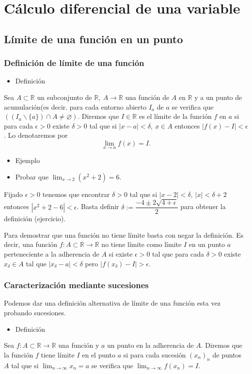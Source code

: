 \section{Cálculo diferencial de una variable}
\subsection{Límite de una función en un punto}
\subsubsection{Definición de límite de una función}
\begin{itemize}[label=\color{red}\textbullet, leftmargin=*]
	\item \color{lightblue}Definición
\end{itemize}
Sea $A\subset\mathbb{R}$ un subconjunto de $\mathbb{R},~A\rightarrow\mathbb{R}$ una función de $A$ en $\mathbb{R}$ y a un punto de acumulación(es decir. para cada entorno abierto $I_a$ de $a$ se verifica que $\left((I_a\backslash\{a\})\cap A\neq\varnothing\right)$. Diremos que $I\in\mathbb{R}$ es el límite de la función $f$ en $a$ si para cada $\epsilon>0$ existe $\delta>0$ tal que si $|x-a|<\delta,~x\in A$ entonces $|f(x)-I|<\epsilon$. Lo denotaremos por \[ \lim_{x\to a}f(x)=I. \]
\begin{itemize}[label=\color{red}\textbullet, leftmargin=*]
	\item \color{lightblue}Ejemplo
\end{itemize}
\begin{itemize}
	\item Probar que $\lim_{x\to2}(x^2+2)=6$.
\end{itemize}
Fijado $\epsilon>0$ tenemos que encontrar $\delta>0$ tal que si $|x-2|<\delta,~|x|<\delta+2$ entonces $|x^2+2-6|<\epsilon$. Basta definir $\delta:=\dfrac{-4\pm2\sqrt{4+\epsilon}}{2}$ para obtener la definición (ejercicio).

Para demostrar que una función no tiene límite basta con negar la definición. Es decir, una función $f:A\subset\mathbb{R}\longrightarrow\mathbb{R}$ no tiene límite como límite $I$ en un punto $a$ perteneciente a la adherencia de $A$ si existe $\epsilon>0$ tal que para cada $\delta>0$ existe $x_\delta\in A$ tal que $|x_\delta-a|<\delta $ pero $|f(x_\delta)-I|>\epsilon$.

\subsubsection{Caracterización mediante sucesiones}
Podemos dar una definición alternativa de límite de una función esta vez probando sucesiones.
\begin{itemize}[label=\color{red}\textbullet, leftmargin=*]
	\item \color{lightblue}Definición
\end{itemize}
Sea $f:A\subset\mathbb{R}\longrightarrow\mathbb{R}$ una función y $a$ un punto en la adherencia de $A$. Diremos que la función $f$ tiene límite $I$ en el punto $a$ si para cada sucesión $(x_n)_n$ de puntos $A$ tal que si $\lim_{n\to\infty}x_n=a$ se verifica que $\lim_{n\to\infty}f(x_n)=I$.

